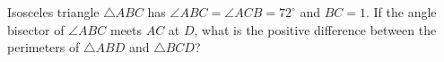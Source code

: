 Isosceles triangle $\triangle{ABC}$ has $\angle{ABC}=\angle{ACB}=72^\circ$ and $BC=1$. If the angle bisector of $\angle{ABC}$ meets $AC$ at $D$, what is the positive difference between the perimeters of $\triangle{ABD}$ and $\triangle{BCD}$?